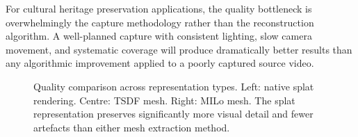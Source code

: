 \begin{keyfinding}
For cultural heritage preservation applications, the quality bottleneck is overwhelmingly the capture methodology rather than the reconstruction algorithm. A well-planned capture with consistent lighting, slow camera movement, and systematic coverage will produce dramatically better results than any algorithmic improvement applied to a poorly captured source video.
\end{keyfinding}

\begin{figure}[htbp]
  \centering
  \caption{Quality comparison across representation types. Left: native splat rendering. Centre: TSDF mesh. Right: MILo mesh. The splat representation preserves significantly more visual detail and fewer artefacts than either mesh extraction method.}
  \label{fig:quality-comparison}
\end{figure}
